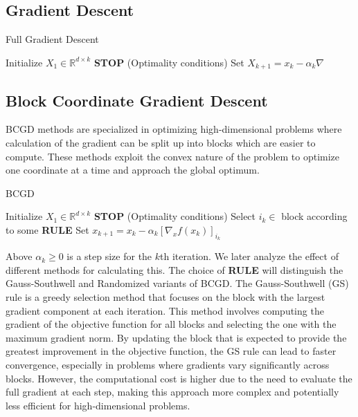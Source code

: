 \documentclass{article}
\begin{document}
\subsection{Gradient Descent}
\begin{algorithm}
\caption{Full Gradient Descent}\label{alg:cap}
\begin{algorithmic}
\State Initialize $X_1 \in \mathbb{R}^{d \times k}$
     \textbf{STOP} (Optimality conditions)
    \State Set $X_{k+1} = x_k - \alpha_k \nabla$
    \EndIf
\EndFor
\end{algorithmic}
\end{algorithm}

\subsection{Block Coordinate Gradient Descent}
BCGD methods are specialized in optimizing high-dimensional problems where calculation of the gradient can be split up into blocks which are easier to compute. These methods exploit the convex nature of the problem to optimize one coordinate at a time and approach the global optimum.

\begin{algorithm}
\caption{BCGD}\label{alg:cap}
\begin{algorithmic}
\State Initialize $X_1 \in \mathbb{R}^{d \times k}$
     \textbf{STOP} (Optimality conditions)
    \State Select $i_k \in $ block according to some \textbf{RULE}
    \State Set $x_{k+1} = x_k - \alpha_k [\nabla_x f(x_k)]_{i_k}$
    \EndIf
\EndFor
\end{algorithmic}
\end{algorithm}

Above $\alpha_k \geq 0$ is a step size for the $k$th iteration. We later analyze the effect of different methods for calculating this. The choice of \textbf{RULE} will distinguish the Gauss-Southwell and Randomized variants of BCGD. The Gauss-Southwell (GS) rule is a greedy selection method that focuses on the block with the largest gradient component at each iteration. This method involves computing the gradient of the objective function for all blocks and selecting the one with the maximum gradient norm. By updating the block that is expected to provide the greatest improvement in the objective function, the GS rule can lead to faster convergence, especially in problems where gradients vary significantly across blocks. However, the computational cost is higher due to the need to evaluate the full gradient at each step, making this approach more complex and potentially less efficient for high-dimensional problems.
\end{document}
